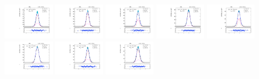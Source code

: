 \begin{figure}[htb]
\includegraphics[width=0.19\textwidth]{plots/Appendix_Recoil_Fits/ZmmMC_PF_13TeV_2G/pfu1fit_24.pdf}
\includegraphics[width=0.19\textwidth]{plots/Appendix_Recoil_Fits/ZmmMC_PF_13TeV_2G/pfu1fit_25.pdf}
\includegraphics[width=0.19\textwidth]{plots/Appendix_Recoil_Fits/ZmmMC_PF_13TeV_2G/pfu1fit_26.pdf}
\includegraphics[width=0.19\textwidth]{plots/Appendix_Recoil_Fits/ZmmMC_PF_13TeV_2G/pfu1fit_27.pdf}
\includegraphics[width=0.19\textwidth]{plots/Appendix_Recoil_Fits/ZmmMC_PF_13TeV_2G/pfu1fit_28.pdf}
\includegraphics[width=0.19\textwidth]{plots/Appendix_Recoil_Fits/ZmmMC_PF_13TeV_2G/pfu1fit_29.pdf}
\includegraphics[width=0.19\textwidth]{plots/Appendix_Recoil_Fits/ZmmMC_PF_13TeV_2G/pfu1fit_30.pdf}
\includegraphics[width=0.19\textwidth]{plots/Appendix_Recoil_Fits/ZmmMC_PF_13TeV_2G/pfu1fit_31.pdf}

\end{figure}

